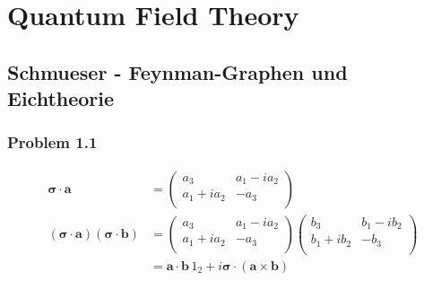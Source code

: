 \documentclass[10pt,a4paper]{book}
\theoremstyle{definition}
\begin{document}
\chapter{Quantum Field Theory}
\section{{\sc Schmueser} - Feynman-Graphen und Eichtheorie}
\subsection{Problem 1.1}
\begin{align}
\mathbf{\sigma}\cdot\mathbf{a}&=
\left(\begin{matrix}
a_3 & a_1-ia_2\\
a_1+ia_2 & -a_3\\
\end{matrix}\right)\\
(\mathbf{\sigma}\cdot\mathbf{a})(\mathbf{\sigma}\cdot\mathbf{b})&=
\left(\begin{matrix}
a_3 & a_1-ia_2\\
a_1+ia_2 & -a_3\\
\end{matrix}\right)\left(\begin{matrix}
b_3 & b_1-ib_2\\
b_1+ib_2 & -b_3\\
\end{matrix}\right)\\
&=\mathbf{a}\cdot\mathbf{b}\,1_2+i\mathbf{\sigma}\cdot(\mathbf{a}\times\mathbf{b})
\end{align}
\end{document}
